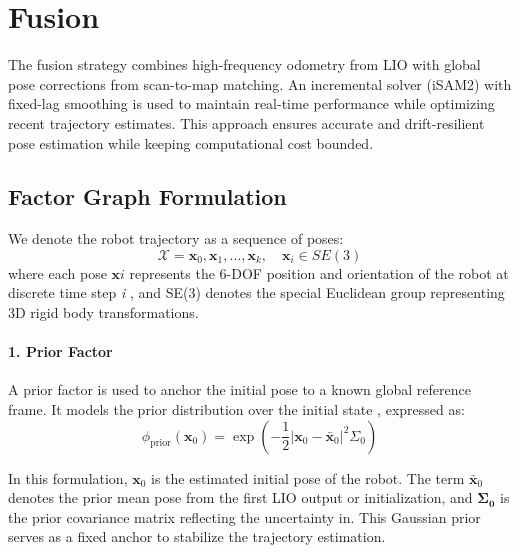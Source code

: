 \section{Fusion}

The fusion strategy combines high-frequency odometry from LIO with global pose corrections from scan-to-map matching. An incremental solver (iSAM2) with fixed-lag smoothing is used to maintain real-time performance while optimizing recent trajectory estimates. This approach ensures accurate and drift-resilient pose estimation while keeping computational cost bounded.

\subsection{Factor Graph Formulation}

We denote the robot trajectory as a sequence of poses:
\begin{equation}
	\mathcal{X} = { \mathbf{x}_0, \mathbf{x}_1, \dots, \mathbf{x}_k }, \quad \mathbf{x}_i \in SE(3)
\end{equation}
where each pose $\mathbf{x}i $  represents the 6-DOF position and orientation of the robot at discrete time step \textit{i} , and SE(3) denotes the special Euclidean group representing 3D rigid body transformations.

\paragraph{1. Prior Factor}
A prior factor is used to anchor the initial pose to a known global reference frame. It models the prior distribution over the initial state , expressed as:
\begin{equation}
	\phi_{\text{prior}}(\mathbf{x}_0) = \exp\left( -\frac{1}{2} | \mathbf{x}_0 - \bar{\mathbf{x}}_0 |^2{\Sigma_0} \right)
\end{equation}

In this formulation, $\mathbf{x}_0$ is the estimated initial pose of the robot. The term $\bar{\mathbf{x}}_0$ denotes the prior mean pose from the first LIO output or initialization, and $\mathbf{{\Sigma_0}}$ is the prior covariance matrix reflecting the uncertainty in. This Gaussian prior serves as a fixed anchor to stabilize the trajectory estimation.

